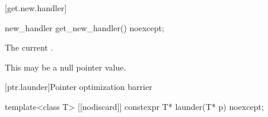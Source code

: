 [get.new.handler]{}

%
\begin{itemdecl}
new_handler get_new_handler() noexcept;
\end{itemdecl}

\begin{itemdescr}
\pnum
\returns
The current .
\begin{note}
This may be a null pointer value.
\end{note}
\end{itemdescr}

[ptr.launder]{Pointer optimization barrier}

%
\begin{itemdecl}
template<class T> [[nodiscard]] constexpr T* launder(T* p) noexcept;
\end{itemdecl}

